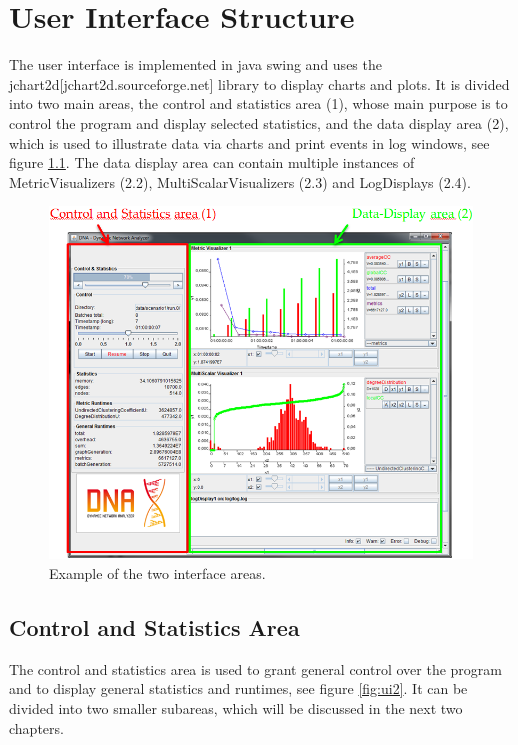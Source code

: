 \chapter{User Interface Structure}
The user interface is implemented in java swing and uses the jchart2d[jchart2d.sourceforge.net] library to display charts and plots. It is divided into two main areas, the control and statistics area (1), whose main purpose is to control the program and display selected statistics, and the data display area (2), which is used to illustrate data via charts and print events in log windows, see figure \ref{fig:ui}. The data display area can contain multiple instances of MetricVisualizers (2.2), MultiScalarVisualizers (2.3) and LogDisplays (2.4).

\begin{figure} [h]
\centering
\includegraphics [scale=0.7] {images/ui}
\caption{Example of the two interface areas.}
\label{fig:ui}
\end{figure}

\section{Control and Statistics Area}
The control and statistics area is used to grant general control over the program and to display general statistics and runtimes, see figure \ref{fig:ui2}. It can be divided into two smaller subareas, which will be discussed in the next two chapters. 

